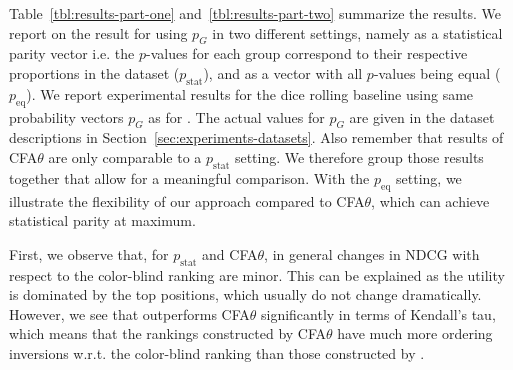%
Table~\ref{tbl:results-part-one} and~\ref{tbl:results-part-two} summarize the results.
%
We report on the result for \algoFAIR using $p_G$ in two different settings, namely as a statistical parity vector i.e. the $p$-values for each group correspond to their respective proportions in the dataset ($p_{\text{stat}}$), and as a vector with all $p$-values being equal ($p_{\text{eq}}$).
%
We report experimental results for the dice rolling baseline using same probability vectors $p_G$ as for \algoFAIR.
%
The actual values for $p_G$ are given in the dataset descriptions in Section~\ref{sec:experiments-datasets}.
%
Also remember that results of CFA$\theta$ are only comparable to a \algoFAIR $p_{\text{stat}}$ setting.
%
We therefore group those results together that allow for a meaningful comparison.
%
With the $p_{\text{eq}}$ setting, we illustrate the flexibility of our approach compared to CFA$\theta$, which can achieve statistical parity at maximum.

First, we observe that, for \algoFAIR $p_{\text{stat}}$ and CFA$\theta$, in general changes in NDCG with respect to the color-blind ranking are minor.
%
This can be explained as the utility is dominated by the top positions, which usually do not change dramatically.
%
However, we see that \algoFAIR outperforms CFA$\theta$ significantly in terms of Kendall's tau, which means that the rankings constructed by CFA$\theta$ have much more ordering inversions w.r.t. the color-blind ranking than those constructed by \algoFAIR. 

